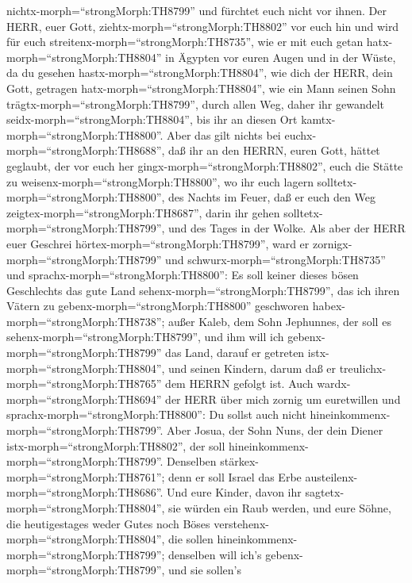 nichtx-morph=``strongMorph:TH8799'' und fürchtet euch nicht vor ihnen.
 Der HERR, euer Gott, ziehtx-morph=``strongMorph:TH8802''
vor euch hin und wird für euch streitenx-morph=``strongMorph:TH8735'',
wie er mit euch getan hatx-morph=``strongMorph:TH8804'' in Ägypten vor
euren Augen  und in der Wüste, da du gesehen
hastx-morph=``strongMorph:TH8804'', wie dich der HERR, dein Gott,
getragen hatx-morph=``strongMorph:TH8804'', wie ein Mann seinen Sohn
trägtx-morph=``strongMorph:TH8799'', durch allen Weg, daher ihr
gewandelt seidx-morph=``strongMorph:TH8804'', bis ihr an diesen Ort
kamtx-morph=``strongMorph:TH8800''.  Aber das gilt nichts
bei euchx-morph=``strongMorph:TH8688'', daß ihr an den HERRN, euren
Gott, hättet geglaubt,  der vor euch her
gingx-morph=``strongMorph:TH8802'', euch die Stätte zu
weisenx-morph=``strongMorph:TH8800'', wo ihr euch lagern
solltetx-morph=``strongMorph:TH8800'', des Nachts im Feuer, daß er euch
den Weg zeigtex-morph=``strongMorph:TH8687'', darin ihr gehen
solltetx-morph=``strongMorph:TH8799'', und des Tages in der Wolke.
 Als aber der HERR euer Geschrei
hörtex-morph=``strongMorph:TH8799'', ward er
zornigx-morph=``strongMorph:TH8799'' und
schwurx-morph=``strongMorph:TH8735'' und
sprachx-morph=``strongMorph:TH8800'':  Es soll keiner
dieses bösen Geschlechts das gute Land
sehenx-morph=``strongMorph:TH8799'', das ich ihren Vätern zu
gebenx-morph=``strongMorph:TH8800'' geschworen
habex-morph=``strongMorph:TH8738'';  außer Kaleb, dem Sohn
Jephunnes, der soll es sehenx-morph=``strongMorph:TH8799'', und ihm will
ich gebenx-morph=``strongMorph:TH8799'' das Land, darauf er getreten
istx-morph=``strongMorph:TH8804'', und seinen Kindern, darum daß er
treulichx-morph=``strongMorph:TH8765'' dem HERRN gefolgt ist.
 Auch wardx-morph=``strongMorph:TH8694'' der HERR über mich
zornig um euretwillen und sprachx-morph=``strongMorph:TH8800'': Du
sollst auch nicht hineinkommenx-morph=``strongMorph:TH8799''.
 Aber Josua, der Sohn Nuns, der dein Diener
istx-morph=``strongMorph:TH8802'', der soll
hineinkommenx-morph=``strongMorph:TH8799''. Denselben
stärkex-morph=``strongMorph:TH8761''; denn er soll Israel das Erbe
austeilenx-morph=``strongMorph:TH8686''.  Und eure Kinder,
davon ihr sagtetx-morph=``strongMorph:TH8804'', sie würden ein Raub
werden, und eure Söhne, die heutigestages weder Gutes noch Böses
verstehenx-morph=``strongMorph:TH8804'', die sollen
hineinkommenx-morph=``strongMorph:TH8799''; denselben will ich's
gebenx-morph=``strongMorph:TH8799'', und sie sollen's
